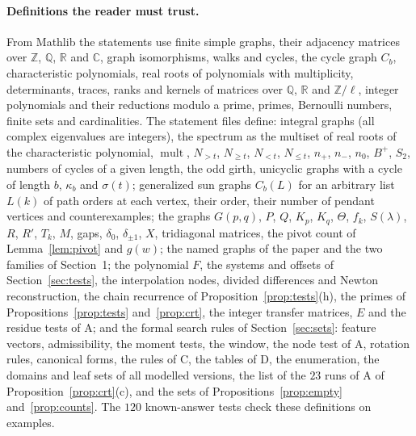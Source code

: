 \documentclass[11pt]{article}
\theoremstyle{definition}
\theoremstyle{remark}
\DeclareMathOperator{\mult}{mult}
\newcommand{\Z}{\mathbb Z}
\newcommand{\R}{\mathbb R}
\newcommand{\Q}{\mathbb Q}
\begin{document}
\paragraph{Definitions the reader must trust.}
From Mathlib the statements use finite simple graphs, their adjacency matrices
over $\Z$, $\Q$, $\R$ and $\mathbb C$, graph isomorphisms, walks and cycles,
the cycle graph $C_b$, characteristic polynomials, real roots of polynomials
with multiplicity, determinants, traces, ranks and kernels of matrices over
$\Q$, $\R$ and $\Z/\ell$, integer polynomials and their reductions modulo a
prime, primes, Bernoulli numbers, finite sets and cardinalities. The statement
files define: integral graphs (all complex eigenvalues are integers), the
spectrum as the multiset of real roots of the characteristic polynomial,
$\mult$, $N_{>t}$, $N_{\ge t}$, $N_{<t}$, $N_{\le t}$, $n_+$, $n_-$, $n_0$,
$B^+$, $S_2$, numbers of cycles of a given length, the odd girth, unicyclic
graphs with a cycle of length $b$, $\kappa_b$ and $\sigma(t)$; generalized sun
graphs $C_b(L)$ for an arbitrary list $L(k)$ of path orders at each vertex,
their order, their number of pendant vertices and counterexamples; the graphs
$G(p,q)$, $P$, $Q$, $K_p$, $K_q$, $\Theta$, $f_k$, $S(\lambda)$, $R$, $R'$,
$T_k$, $M$, gaps, $\delta_0$, $\delta_{\pm1}$, $X$, tridiagonal matrices, the
pivot count of Lemma~\ref{lem:pivot} and $g(w)$; the named graphs of the paper
and the two families of Section~1; the polynomial $F$, the systems and offsets
of Section~\ref{sec:tests}, the interpolation nodes, divided differences and
Newton reconstruction, the chain recurrence of Proposition~\ref{prop:tests}(h),
the primes of Propositions~\ref{prop:tests} and~\ref{prop:crt}, the integer
transfer matrices, $E$ and the residue tests of A; and the formal search
rules of Section~\ref{sec:sets}: feature vectors, admissibility, the moment
tests, the window, the node test of A, rotation rules, canonical forms, the
rules of C, the tables of D, the enumeration, the domains and leaf sets of all
modelled versions, the list of the $23$ runs of A of
Proposition~\ref{prop:crt}(c), and the sets of Propositions~\ref{prop:empty}
and~\ref{prop:counts}. The $120$ known-answer tests check these definitions on
examples.
\end{document}
